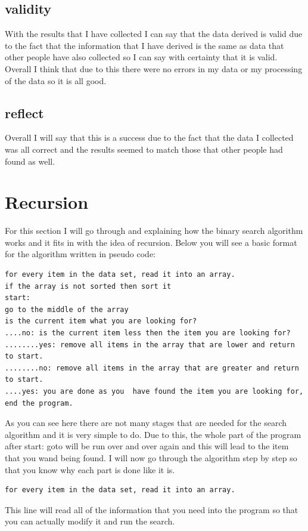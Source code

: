 \documentclass{article}
\begin{document}
\subsection{validity}
With the results that I have collected I can say that the data derived is valid due to the fact that the information that I have derived is the same as data that other people have also collected so I can say with certainty that it is valid. Overall I think that due to this there were no errors in my data or my processing of the data so it is all good. 
\subsection{reflect}
Overall I will say that this is a success due to the fact that the data I collected was all correct and the results seemed to match those that other people had found as well.  
\section{Recursion}
For this section I will go through and explaining how the binary search algorithm works and it fits in with the idea of recursion. Below you will see a basic format for the algorithm written in pseudo code:

\begin{verbatim}
for every item in the data set, read it into an array. 
if the array is not sorted then sort it
start:
go to the middle of the array 
is the current item what you are looking for?
....no: is the current item less then the item you are looking for?
........yes: remove all items in the array that are lower and return to start.
........no: remove all items in the array that are greater and return to start.
....yes: you are done as you  have found the item you are looking for, end the program. 
\end{verbatim}
As you can see here there are not many stages that are needed for the search algorithm and it is very simple to do. Due to this, the whole part of the program after start: goto will be run over and over again and this will lead to the item that you wand being found. I will now go through the algorithm step by step so that you know why each part is done like it is. 

\begin{verbatim}
for every item in the data set, read it into an array. 
\end{verbatim}
This line will read all of the information that you need into the program so that you can actually modify it and run the search. 
\end{document}

